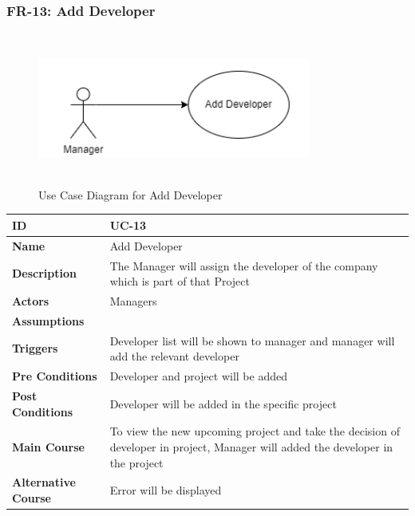     \subsubsection{FR-13: Add Developer}
    \begin{figure}[H]
        \includegraphics[height=5cm, width=0.8\textwidth]{./diagrams/Use Case/u13.png}
        \centering 
        \caption{Use Case Diagram for Add Developer}
        \label{fig:Usecase1}
        \end{figure}
        
    \begin{center}
        \begin{tabularx}{\textwidth}{|l|X|}
            \hline
            \textbf{ID} & UC-13 \\
            \hline
            \textbf{Name} & Add Developer \\
            \hline
            \textbf{Description} & The Manager will assign the developer of the company which is part of that Project \\
            \hline
            \textbf{Actors} & Managers \\
            \hline
            \textbf{Assumptions} &  \\
            \hline
            \textbf{Triggers} & Developer list will be shown to manager and manager will add the relevant developer \\
            \hline
            \textbf{Pre Conditions} & Developer and project will be added \\
            \hline
            \textbf{Post Conditions} & Developer will be added in the specific project \\
            \hline
            \textbf{Main Course} & To view the new upcoming project and take the decision of developer in project, Manager will added the developer in the project \\
            \hline
            \textbf{Alternative Course} & Error will be displayed \\
            \hline
            
        \end{tabularx}
    \end{center}
    
